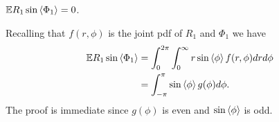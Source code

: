 \documentclass[journal]{IEEEtran}
\begin{document}
\begin{lemma}\label{lem:expectImRfracpart}
${\mathbb E} R_1 \sin\left\langle \Phi_1 \right\rangle = 0$.
\end{lemma}
\begin{IEEEproof}
Recalling that $f(r,\phi)$ is the joint pdf of $R_1$ and $\Phi_1$ we have
\begin{align*}
{\mathbb E} R_1 \sin\left\langle \Phi_1 \right\rangle &= \int_{0}^{2\pi} \int_{0}^\infty r \sin\left\langle \phi \right\rangle f(r,\phi) dr d\phi \\
&= \int_{-\pi}^{\pi} \sin\left\langle \phi \right\rangle g(\phi) d\phi.
\end{align*}
The proof is immediate since $g(\phi)$ is even and $\sin\left\langle \phi \right\rangle$ is odd.
\end{IEEEproof}
\end{document}
